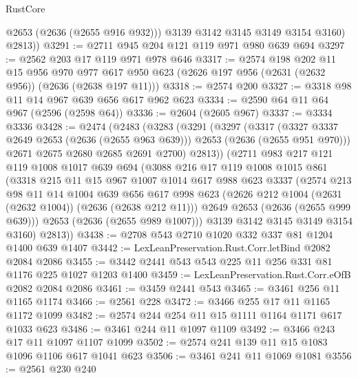 \begin{lexlean}{RustCore}
\begin{coremodule}
            @2653
            (@2636 (@2655 @916 @932)))
          @3139
          @3142
          @3145
          @3149
          @3154
          @3160)
        @2813))
@3291 := @2711 @945 @204 @121 @119 @971 @980 @639 @694
@3297 := @2562 @203 @17 @119 @971 @978 @646
@3317 := @2574
    @198
    @202
    @11
    @15
    @956
    @970
    @977
    @617
    @950
    @623
    (@2626 @197 @956 (@2631 (@2632 @956)) (@2636 (@2638 @197 @11)))
@3318 := @2574 @200
@3327 := @3318 @98 @11 @14 @967 @639 @656 @617 @962 @623
@3334 := @2590 @64 @11 @64 @967 (@2596 (@2598 @64))
@3336 := @2604 (@2605 @967)
@3337 := @3334 @3336
@3428 := @2474
    (@2483
      (@3283
        (@3291
          (@3297
            (@3317
              (@3327 @3337 @2649 @2653 (@2636 (@2655 @963 @639)))
              @2653
              (@2636 (@2655 @951 @970)))
            @2671
            @2675
            @2680
            @2685
            @2691
            @2700)
          @2813))
      (@2711
        @983
        @217
        @121
        @119
        @1008
        @1017
        @639
        @694
        (@3088
          @216
          @17
          @119
          @1008
          @1015
          @861
          (@3318
            @215
            @11
            @15
            @967
            @1007
            @1014
            @617
            @988
            @623
            @3337
            (@2574
              @213
              @98
              @11
              @14
              @1004
              @639
              @656
              @617
              @998
              @623
              (@2626 @212 @1004 (@2631 (@2632 @1004)) (@2636 (@2638 @212 @11)))
              @2649
              @2653
              (@2636 (@2655 @999 @639)))
            @2653
            (@2636 (@2655 @989 @1007)))
          @3139
          @3142
          @3145
          @3149
          @3154
          @3160)
        @2813))
@3438 := @2708 @543 @2710 @1020 @332 @337 @81 @1204 @1400 @639 @1407
@3442 := LexLeanPreservation.Rust.Corr.letBind @2082 @2084 @2086
@3455 := @3442 @2441 @543 @543 @225 @11 @256 @331 @81 @1176 @225 @1027 @1203 @1400
@3459 := LexLeanPreservation.Rust.Corr.eOfB @2082 @2084 @2086
@3461 := @3459 @2441 @543
@3465 := @3461 @256 @11 @1165 @1174
@3466 := @2561 @228
@3472 := @3466 @255 @17 @11 @1165 @1172 @1099
@3482 := @2574 @244 @254 @11 @15 @1111 @1164 @1171 @617 @1033 @623
@3486 := @3461 @244 @11 @1097 @1109
@3492 := @3466 @243 @17 @11 @1097 @1107 @1099
@3502 := @2574 @241 @139 @11 @15 @1083 @1096 @1106 @617 @1041 @623
@3506 := @3461 @241 @11 @1069 @1081
@3556 := @2561
    @230
    @240

\end{coremodule}
\end{lexlean}
